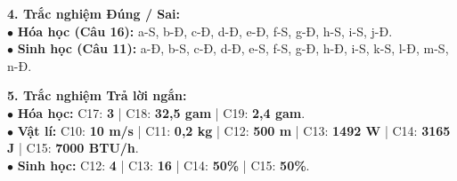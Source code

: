 \documentclass{article}
\begin{document}
\textbf{4. Trắc nghiệm Đúng / Sai:}\\
$\bullet$ \textbf{Hóa học (Câu 16):} a-S, b-Đ, c-Đ, d-Đ, e-Đ, f-S, g-Đ, h-S, i-S, j-Đ.\\
$\bullet$ \textbf{Sinh học (Câu 11):} a-Đ, b-S, c-Đ, d-Đ, e-S, f-S, g-Đ, h-Đ, i-S, k-S, l-Đ, m-S, n-Đ.
\vspace{4pt}

\textbf{5. Trắc nghiệm Trả lời ngắn:}\\
$\bullet$ \textbf{Hóa học:} C17: \textbf{3} | C18: \textbf{32,5 gam} | C19: \textbf{2,4 gam}.\\
$\bullet$ \textbf{Vật lí:} C10: \textbf{10 m/s} | C11: \textbf{0,2 kg} | C12: \textbf{500 m} | C13: \textbf{1492 W} | C14: \textbf{3165 J} | C15: \textbf{7000 BTU/h}.\\
$\bullet$ \textbf{Sinh học:} C12: \textbf{4} | C13: \textbf{16} | C14: \textbf{50\%} | C15: \textbf{50\%}.
\end{document}
